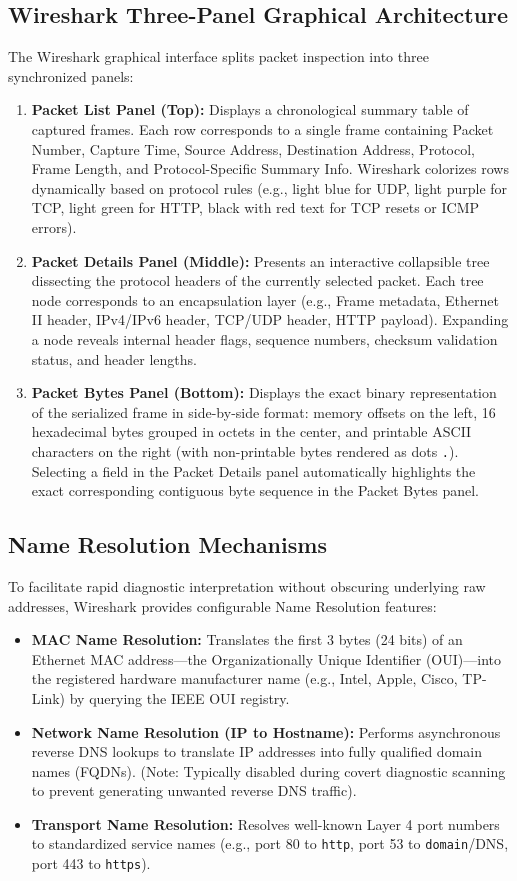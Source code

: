 \documentclass[12pt, a4paper]{article}
\begin{document}
\subsection{Wireshark Three-Panel Graphical Architecture}
The Wireshark graphical interface splits packet inspection into three synchronized panels:
\begin{enumerate}
    \item \textbf{Packet List Panel (Top):} Displays a chronological summary table of captured frames. Each row corresponds to a single frame containing Packet Number, Capture Time, Source Address, Destination Address, Protocol, Frame Length, and Protocol-Specific Summary Info. Wireshark colorizes rows dynamically based on protocol rules (e.g., light blue for UDP, light purple for TCP, light green for HTTP, black with red text for TCP resets or ICMP errors).
    \item \textbf{Packet Details Panel (Middle):} Presents an interactive collapsible tree dissecting the protocol headers of the currently selected packet. Each tree node corresponds to an encapsulation layer (e.g., Frame metadata, Ethernet II header, IPv4/IPv6 header, TCP/UDP header, HTTP payload). Expanding a node reveals internal header flags, sequence numbers, checksum validation status, and header lengths.
    \item \textbf{Packet Bytes Panel (Bottom):} Displays the exact binary representation of the serialized frame in side-by-side format: memory offsets on the left, 16 hexadecimal bytes grouped in octets in the center, and printable ASCII characters on the right (with non-printable bytes rendered as dots \texttt{.}). Selecting a field in the Packet Details panel automatically highlights the exact corresponding contiguous byte sequence in the Packet Bytes panel.
\end{enumerate}

\subsection{Name Resolution Mechanisms}
To facilitate rapid diagnostic interpretation without obscuring underlying raw addresses, Wireshark provides configurable Name Resolution features:
\begin{itemize}
    \item \textbf{MAC Name Resolution:} Translates the first 3 bytes (24 bits) of an Ethernet MAC address---the Organizationally Unique Identifier (OUI)---into the registered hardware manufacturer name (e.g., Intel, Apple, Cisco, TP-Link) by querying the IEEE OUI registry.
    \item \textbf{Network Name Resolution (IP to Hostname):} Performs asynchronous reverse DNS lookups to translate IP addresses into fully qualified domain names (FQDNs). (Note: Typically disabled during covert diagnostic scanning to prevent generating unwanted reverse DNS traffic).
    \item \textbf{Transport Name Resolution:} Resolves well-known Layer 4 port numbers to standardized service names (e.g., port 80 to \texttt{http}, port 53 to \texttt{domain}/DNS, port 443 to \texttt{https}).
\end{itemize}
\end{document}
